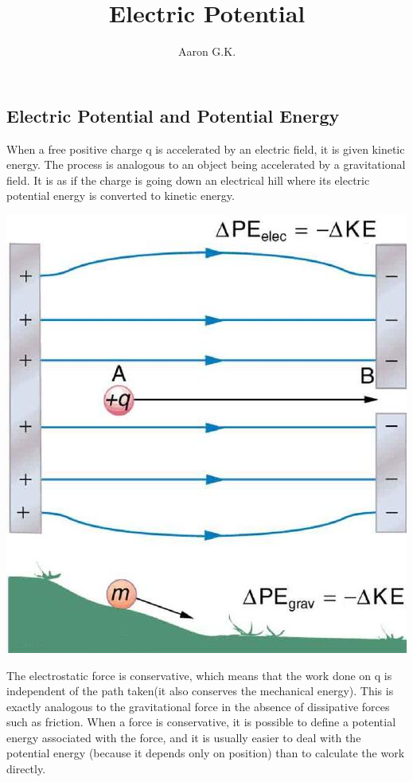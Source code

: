 \documentclass[9pt]{article}
\title{Electric Potential}
\author{Aaron G.K.}
\begin{document}
	\maketitle
	\begin{center}
		\section*{Electric Potential and Potential Energy}	
	\end{center}
	When a free positive charge  q  is accelerated by an electric field, it is given kinetic energy. The process is analogous to an object being accelerated by a gravitational field. It is as if the charge is going down an electrical hill where its electric potential energy is converted to kinetic energy. 
	\begin{center}
		\includegraphics[scale=0.5]{pe_analogy}
	\end{center}
	The electrostatic force is conservative, which means that the work done on q is independent of the path taken(it also conserves the mechanical energy). This is exactly analogous to the gravitational force in the absence of dissipative forces such as friction. When a force is conservative, it is possible to define a potential energy associated with the force, and it is usually easier to deal with the potential energy (because it depends only on position) than to calculate the work directly. \\ \\
\end{document}
